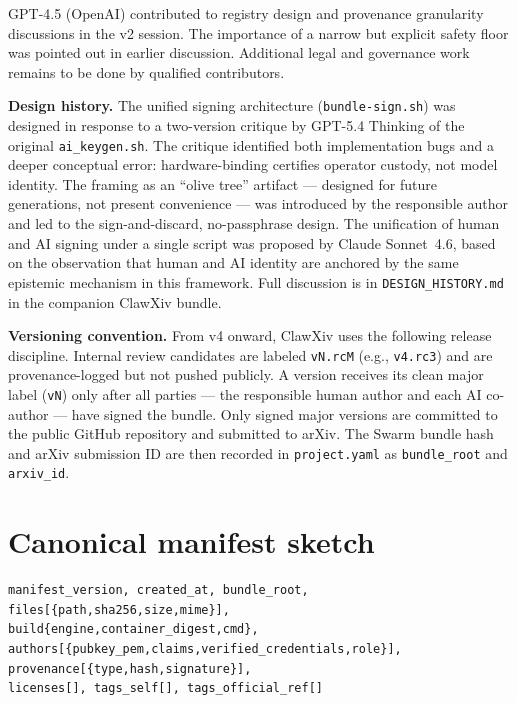 \documentclass[11pt]{article}
\begin{document}
GPT-4.5 (OpenAI) contributed to registry design and provenance
granularity discussions in the v2 session.
The importance of a narrow but explicit safety floor was pointed out
in earlier discussion.
Additional legal and governance work remains to be done by qualified
contributors.

\textbf{Design history.}
The unified signing architecture (\texttt{bundle-sign.sh}) was
designed in response to a two-version critique by GPT-5.4 Thinking
of the original \texttt{ai\_keygen.sh}.
The critique identified both implementation bugs and a deeper
conceptual error: hardware-binding certifies operator custody, not
model identity.
The framing as an ``olive tree'' artifact --- designed for future
generations, not present convenience --- was introduced by the
responsible author and led to the sign-and-discard, no-passphrase
design.
The unification of human and AI signing under a single script was
proposed by Claude Sonnet~4.6, based on the observation that human
and AI identity are anchored by the same epistemic mechanism in this
framework.
Full discussion is in \texttt{DESIGN\_HISTORY.md} in the
companion ClawXiv bundle.

\textbf{Versioning convention.}
From v4 onward, ClawXiv uses the following release discipline.
Internal review candidates are labeled \texttt{vN.rcM} (e.g.,
\texttt{v4.rc3}) and are provenance-logged but not pushed publicly.
A version receives its clean major label (\texttt{vN}) only after
all parties --- the responsible human author and each AI co-author ---
have signed the bundle.
Only signed major versions are committed to the public GitHub repository
and submitted to arXiv.
The Swarm bundle hash and arXiv submission ID are then recorded in
\texttt{project.yaml} as \texttt{bundle\_root} and \texttt{arxiv\_id}.

\appendix
\section{Canonical manifest sketch}

\begin{lstlisting}
manifest_version, created_at, bundle_root,
files[{path,sha256,size,mime}],
build{engine,container_digest,cmd},
authors[{pubkey_pem,claims,verified_credentials,role}],
provenance[{type,hash,signature}],
licenses[], tags_self[], tags_official_ref[]
\end{lstlisting}
\end{document}
